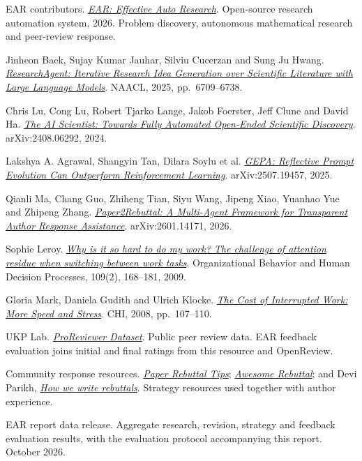 \begin{enumerate}[label=\textcolor{teal}{[\arabic*]},leftmargin=9mm,itemsep=6pt,font=\sffamily\small]
\item EAR contributors. \href{https://github.com/liyingze07-svg/EffectiveAutoResearch-EAR-}{\emph{EAR: Effective Auto Research}}. Open-source research automation system, 2026. Problem discovery, autonomous mathematical research and peer-review response.
\item Jinheon Baek, Sujay Kumar Jauhar, Silviu Cucerzan and Sung Ju Hwang. \href{https://aclanthology.org/2025.naacl-long.342/}{\emph{ResearchAgent: Iterative Research Idea Generation over Scientific Literature with Large Language Models}}. NAACL, 2025, pp.\ 6709--6738.
\item Chris Lu, Cong Lu, Robert Tjarko Lange, Jakob Foerster, Jeff Clune and David Ha. \href{https://arxiv.org/abs/2408.06292}{\emph{The AI Scientist: Towards Fully Automated Open-Ended Scientific Discovery}}. arXiv:2408.06292, 2024.
\item Lakshya A. Agrawal, Shangyin Tan, Dilara Soylu et al. \href{https://arxiv.org/abs/2507.19457}{\emph{GEPA: Reflective Prompt Evolution Can Outperform Reinforcement Learning}}. arXiv:2507.19457, 2025.
\item Qianli Ma, Chang Guo, Zhiheng Tian, Siyu Wang, Jipeng Xiao, Yuanhao Yue and Zhipeng Zhang. \href{https://arxiv.org/abs/2601.14171}{\emph{Paper2Rebuttal: A Multi-Agent Framework for Transparent Author Response Assistance}}. arXiv:2601.14171, 2026.
\item Sophie Leroy. \href{https://doi.org/10.1016/j.obhdp.2009.04.002}{\emph{Why is it so hard to do my work? The challenge of attention residue when switching between work tasks}}. Organizational Behavior and Human Decision Processes, 109(2), 168--181, 2009.
\item Gloria Mark, Daniela Gudith and Ulrich Klocke. \href{https://www.ics.uci.edu/~gmark/chi08-mark.pdf}{\emph{The Cost of Interrupted Work: More Speed and Stress}}. CHI, 2008, pp.\ 107--110.
\item UKP Lab. \href{https://huggingface.co/datasets/UKPLab/ProReviewer-Dataset}{\emph{ProReviewer Dataset}}. Public peer review data. EAR feedback evaluation joins initial and final ratings from this resource and OpenReview.
\item Community response resources. \href{https://github.com/MLNLP-World/Paper-Rebuttal-Tips}{\emph{Paper Rebuttal Tips}}; \href{https://github.com/xiongqi123123/awesome-rebuttal}{\emph{Awesome Rebuttal}}; and Devi Parikh, \href{https://deviparikh.substack.com/p/how-we-write-rebuttals-dc84742fece1}{\emph{How we write rebuttals}}. Strategy resources used together with author experience.
\item EAR report data release. Aggregate research, revision, strategy and feedback evaluation results, with the evaluation protocol accompanying this report. October 2026.
\end{enumerate}
